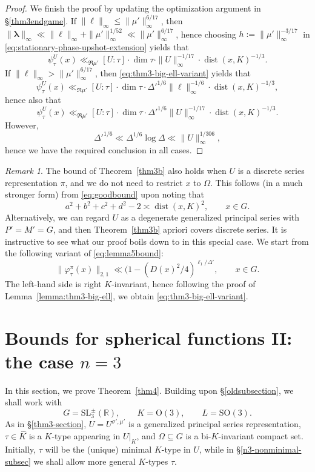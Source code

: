 \documentclass[11pt,oneside]{amsart}
\numberwithin{equation}{section}
\theoremstyle{remark}
\newtheorem{remark}{Remark}
\theoremstyle{plain}
\DeclareMathOperator{\dist}{dist}
\newcommand\SL{\mathrm{SL}}
\newcommand\OO{\mathrm{O}}
\newcommand\SO{\mathrm{SO}}
\newcommand\RR{\mathbb{R}}
\renewcommand\leq{\leqslant}
\begin{document}
\begin{proof}
We finish the proof by updating the optimization argument in \S\ref{thm3endgame}. If $\|\bm{\ell}\|_{\infty}\leq\|\mu'\|_{\infty}^{6/17}$, then $\|\bm\lambda\|_\infty\ll\|\bm\ell\|_\infty+\|\mu'\|_{\infty}^{1/52}\ll\|\mu'\|_{\infty}^{6/17}$, hence 
choosing $h:=\|\mu'\|_{\infty}^{-3/17}$ in \eqref{eq:stationary-phase-upshot-extension} yields that
\[\psi_\tau^{U}(x) \ll_{\Re\mu'} [U:\tau]\cdot\dim\tau\cdot\|U\|_{\infty}^{-1/17}\cdot\dist(x,K)^{-1/3}.\]
If $\|\bm{\ell}\|_{\infty}>\|\mu'\|_{\infty}^{6/17}$, then \eqref{eq:thm3-big-ell-variant} yields that
\[\psi_{\tau}^{U}(x) \ll_{\Re\mu'} [U:\tau]\cdot\dim \tau \cdot \Delta'^{1/6}\|\bm\ell\|_{\infty}^{-1/6}\cdot\dist(x,K)^{-1/3},\]
hence also that
\[\psi_{\tau}^{U}(x) \ll_{\Re\mu'} [U:\tau]\cdot\dim \tau \cdot \Delta'^{1/6}\|U\|_{\infty}^{-1/17}\cdot\dist(x,K)^{-1/3}.\]
However,
\[\Delta'^{1/6}\ll\Delta^{1/6}\log\Delta\ll\|U\|_\infty^{1/306},\]
hence we have the required conclusion in all cases.
\end{proof}

\begin{remark}\label{rmk-to-thm3b} The bound of Theorem~\ref{thm3b} also holds when $U$ is a discrete series representation $\pi$, and we do not need to restrict $x$ to $\Omega$. This follows (in a much stronger form) from \eqref{eq:goodbound} upon noting that
\[
a^2+b^2+c^2+d^2 - 2 \asymp \dist(x,K)^2,\qquad x\in G.
\]
Alternatively, we can regard $U$ as a degenerate generalized principal series with $P'=M'=G$, and then Theorem~\ref{thm3b} apriori covers discrete series. It is instructive to see what our proof boils down to in this special case. We start from the following variant of \eqref{eq:lemma5bound}:
\[
\|\varphi^{\pi}_{\tau}(x)\|_{2,1} \ll (1-(D(x)^2/4)^{\ell_1/\Delta'}, \qquad x\in G.
\]
The left-hand side is right $K$-invariant, hence following the proof of Lemma~\ref{lemma:thm3-big-ell}, we obtain \eqref{eq:thm3-big-ell-variant}.
\end{remark}

\section{Bounds for spherical functions II: the case $n=3$}\label{section_for_n_equals3}

In this section, we prove Theorem~\ref{thm4}. Building upon \S\ref{oldsubsection}, we shall work with
\[G = \SL_3^{\pm}(\RR),\qquad K=\OO(3),\qquad L=\SO(3).\]
As in \S\ref{thm3-section}, $U=U^{\sigma',\mu'}$ is a generalized principal series representation, $\tau\in\widehat{K}$ is a $K$-type appearing in $U|_K$, and $\Omega\subseteq G$ is a bi-$K$-invariant compact set. Initially, $\tau$ will be the (unique) minimal $K$-type in $U$, while in \S\ref{n3-nonminimal-subsec} we shall allow more general $K$-types $\tau$.
\end{document}
